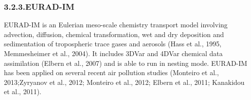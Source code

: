 \documentclass[9pt]{report}
\begin{document}
\begin{table}[h!]%
\begin{mdcenter}%
{}%
\end{mdcenter}\label{emep-portfolio}%
\end{table}%

\subsubsection{3.2.3.\hspace*{0.5em}EURAD-IM}\label{sec-eurad-im}%

\noindent{}EURAD-IM is an Eulerian meso-scale chemistry transport model involving advection, diffusion, chemical transformation, wet and dry deposition and sedimentation of tropospheric trace gases and aerosols (Hass et al., 1995, Memmesheimer et al., 2004). It includes 3DVar and 4DVar chemical data assimilation (Elbern et al., 2007) and is able to run in nesting mode.
EURAD-IM has been applied on several recent air pollution studies (Monteiro et al., 2013;Zyryanov et al., 2012; Monteiro et al., 2012; Elbern et al., 2011; Kanakidou et al., 2011).%
\end{document}
